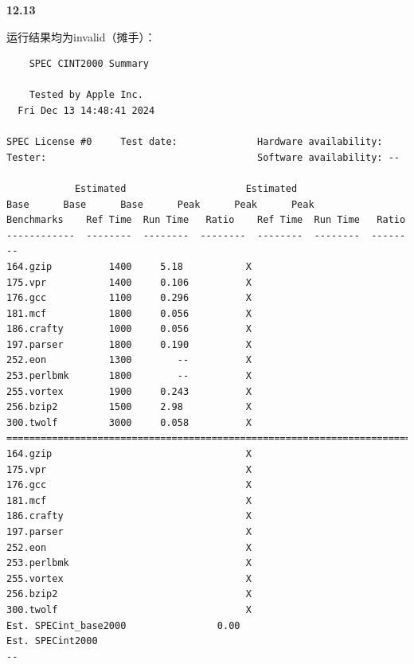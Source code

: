 \documentclass[UTF8]{report}
\begin{document}
\noindent
\textbf{12.13}

运行结果均为invalid（摊手）：

\begin{lstlisting}
    SPEC CINT2000 Summary
                                       
    Tested by Apple Inc.
  Fri Dec 13 14:48:41 2024

SPEC License #0     Test date:              Hardware availability: 
Tester:                                     Software availability: --

            Estimated                     Estimated
Base      Base      Base      Peak      Peak      Peak
Benchmarks    Ref Time  Run Time   Ratio    Ref Time  Run Time   Ratio
------------  --------  --------  --------  --------  --------  --------
164.gzip          1400     5.18           X                             
175.vpr           1400     0.106          X                             
176.gcc           1100     0.296          X                             
181.mcf           1800     0.056          X                             
186.crafty        1000     0.056          X                             
197.parser        1800     0.190          X                             
252.eon           1300        --          X                             
253.perlbmk       1800        --          X                             
255.vortex        1900     0.243          X                             
256.bzip2         1500     2.98           X                             
300.twolf         3000     0.058          X                             
========================================================================
164.gzip                                  X                             
175.vpr                                   X                             
176.gcc                                   X                             
181.mcf                                   X                             
186.crafty                                X                             
197.parser                                X                             
252.eon                                   X                             
253.perlbmk                               X                             
255.vortex                                X                             
256.bzip2                                 X                             
300.twolf                                 X                             
Est. SPECint_base2000                0.00 
Est. SPECint2000                                                      --

\end{lstlisting}
\end{document}
